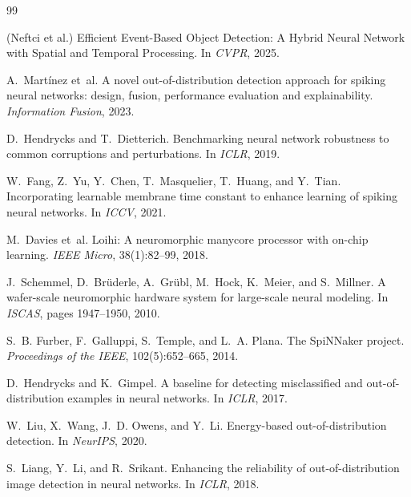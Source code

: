 \begin{thebibliography}{99}

(Neftci et al.)
\newblock Efficient Event-Based Object Detection: A Hybrid Neural Network with Spatial and
  Temporal Processing.
\newblock In \emph{CVPR}, 2025.

A.~Mart\'inez et~al.
\newblock A novel out-of-distribution detection approach for spiking neural networks: design,
  fusion, performance evaluation and explainability.
\newblock \emph{Information Fusion}, 2023.

D.~Hendrycks and T.~Dietterich.
\newblock Benchmarking neural network robustness to common corruptions and perturbations.
\newblock In \emph{ICLR}, 2019.

W.~Fang, Z.~Yu, Y.~Chen, T.~Masquelier, T.~Huang, and Y.~Tian.
\newblock Incorporating learnable membrane time constant to enhance learning of spiking neural
  networks.
\newblock In \emph{ICCV}, 2021.

M.~Davies et~al.
\newblock Loihi: A neuromorphic manycore processor with on-chip learning.
\newblock \emph{IEEE Micro}, 38(1):82--99, 2018.

J.~Schemmel, D.~Br\"uderle, A.~Gr\"ubl, M.~Hock, K.~Meier, and S.~Millner.
\newblock A wafer-scale neuromorphic hardware system for large-scale neural modeling.
\newblock In \emph{ISCAS}, pages 1947--1950, 2010.

S.~B. Furber, F.~Galluppi, S.~Temple, and L.~A. Plana.
\newblock The SpiNNaker project.
\newblock \emph{Proceedings of the IEEE}, 102(5):652--665, 2014.

D.~Hendrycks and K.~Gimpel.
\newblock A baseline for detecting misclassified and out-of-distribution examples in neural
  networks.
\newblock In \emph{ICLR}, 2017.

W.~Liu, X.~Wang, J.~D. Owens, and Y.~Li.
\newblock Energy-based out-of-distribution detection.
\newblock In \emph{NeurIPS}, 2020.

S.~Liang, Y.~Li, and R.~Srikant.
\newblock Enhancing the reliability of out-of-distribution image detection in neural networks.
\newblock In \emph{ICLR}, 2018.


\end{thebibliography}
